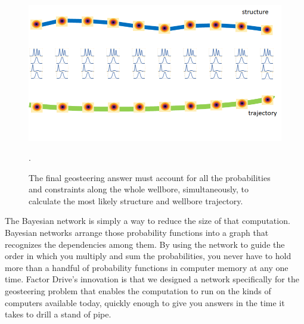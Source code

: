 \documentclass{tufte-handout}
\begin{document}
\begin{figure}[h]
    \includegraphics[width=\linewidth]{the-answer.png}
    \caption{
    The final geosteering answer must account for all the probabilities and constraints
    along the whole wellbore, simultaneously, to calculate the most likely structure and
    wellbore trajectory.
    }.
    \label{fig:the-answer}
\end{figure}

The Bayesian network is simply a way to reduce the size of that computation. 
Bayesian networks arrange those probability functions into a graph that recognizes
the dependencies among them. By using the network to guide the order in which you multiply
and sum the probabilities, you never have to hold more than a handful of probability 
functions in computer memory at any one time. Factor Drive's innovation is that we designed
a network specifically for the geosteering problem that enables the computation to run
on the kinds of computers available today, quickly enough to give you answers in the
time it takes to drill a stand of pipe.



\end{document}
